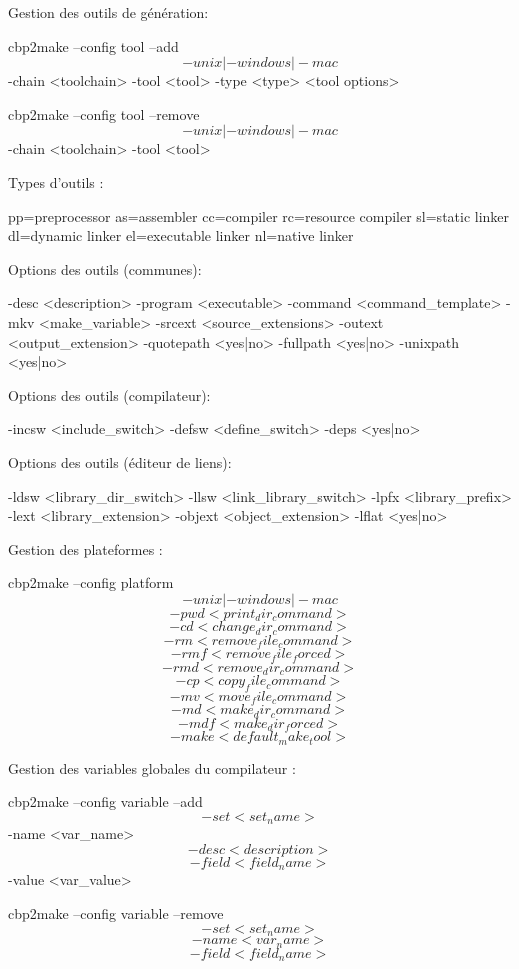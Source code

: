 Gestion des outils de génération:
\begin{code}
cbp2make --config tool --add \[-unix|-windows|-mac\] -chain <toolchain>
         -tool <tool> -type <type> <tool options>
         
cbp2make --config tool --remove \[-unix|-windows|-mac\] -chain <toolchain>
         -tool <tool>
\end{code}

Types d'outils :      
\begin{code}
    pp=preprocessor as=assembler cc=compiler rc=resource compiler
    sl=static linker dl=dynamic linker el=executable linker
    nl=native linker
\end{code}

Options des outils (communes):
\begin{code}
    -desc <description> -program <executable> -command <command_template>
    -mkv <make_variable> -srcext <source_extensions> -outext <output_extension>
    -quotepath <yes|no> -fullpath <yes|no> -unixpath <yes|no>
\end{code}

Options des outils (compilateur):
\begin{code}
    -incsw <include_switch> -defsw <define_switch> -deps <yes|no>
\end{code}

Options des outils (éditeur de liens):
\begin{code}
    -ldsw <library_dir_switch> -llsw <link_library_switch> -lpfx <library_prefix>
    -lext <library_extension> -objext <object_extension> -lflat <yes|no>
\end{code}

Gestion des plateformes :
\begin{code}
cbp2make --config platform \[-unix|-windows|-mac\] \[-pwd <print_dir_command>\]
         \[-cd <change_dir_command>\] \[-rm <remove_file_command>\]
         \[-rmf <remove_file_forced>\] \[-rmd <remove_dir_command>\]
         \[-cp <copy_file_command>\] \[-mv <move_file_command>\]
         \[-md <make_dir_command>\] \[-mdf <make_dir_forced>\]
         \[-make <default_make_tool>\]         
\end{code}

\begin{samepage}
Gestion des variables globales du compilateur :
\begin{code}
cbp2make --config variable --add \[-set <set_name>\] -name <var_name>
        \[-desc <description>\] \[-field <field_name>\] -value <var_value>
        
cbp2make --config variable --remove \[-set <set_name>\] \[-name <var_name>\]
        \[-field <field_name>\]
\end{code}
\end{samepage}


